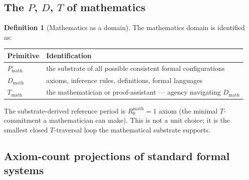 \documentclass[11pt,a4paper]{article}
\theoremstyle{definition}
\newtheorem{definition}[theorem]{Definition}
\theoremstyle{remark}
\begin{document}
\subsection{The $P$, $D$, $T$ of mathematics}

\begin{definition}[Mathematics as a domain]\label{def:math-domain}
The mathematics domain is identified as:
\begin{center}
\begin{tabular}{@{}l l@{}}
\toprule
Primitive & Identification\\
\midrule
$P_{\mathrm{math}}$ & the substrate of all possible consistent formal configurations\\
$D_{\mathrm{math}}$ & axioms, inference rules, definitions, formal languages\\
$T_{\mathrm{math}}$ & the mathematician or proof-assistant --- agency navigating $D_{\mathrm{math}}$\\
\bottomrule
\end{tabular}
\end{center}
The substrate-derived reference period is $R_{0}^{\mathrm{math}} = 1$ axiom (the minimal $T$-commitment a mathematician can make). This is not a unit choice; it is the smallest closed $T$-traversal loop the mathematical substrate supports.
\end{definition}

\subsection{Axiom-count projections of standard formal systems}
\end{document}
